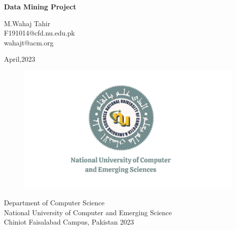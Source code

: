 \begin{Titlepage}
\begin{center}
    \vspace*{2cm}
    
    \textbf{\Large  Data Mining Project}\\
    \vspace*{2cm}
      \begin{center}
          \large M.Wahaj Tahir\\F191014@cfd.nu.edu.pk\\wahajt@acm.org
      \end{center} 
    
    \vspace{1.5cm}
    
    \vspace{0.3cm}
    \begin{center}
           \large April,2023
      \end{center}
    \vfill
    \vspace{0.8cm}
    \begin{figure}[hb]
        \centering
        \includegraphics[scale=0.20]{Fast-Nuces.png}
    \end{figure}
    

     Department of Computer Science\\ National University of Computer and Emerging Science\\ Chiniot Faisalabad Campus, Pakistan 2023
    \end{center}

\end{Titlepage}